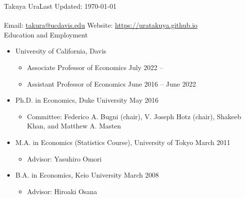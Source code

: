 \documentclass{article}
\begin{document}
{\large\noindent Takuya Ura}\hfill  Last Updated: \today \\
\\
Email: \href{mailto:takura@ucdavis.edu}{takura@ucdavis.edu} \hfill Website: \href{https://uratakuya.github.io}{https://uratakuya.github.io}\\

\bigskip\noindent Education and Employment 
\begin{itemize}
\item[] University of California, Davis
\begin{itemize}
\item[] Associate Professor of Economics \hfill July 2022 -- %
\item[] Assistant Professor of Economics \hfill June 2016 -- June 2022 %
\end{itemize}
\item[] Ph.D. in Economics, Duke University \hfill May 2016%
\begin{itemize}
\item[] Committee: Federico A. Bugni (chair), V. Joseph Hotz (chair), Shakeeb Khan, and Matthew A. Masten
\end{itemize}
\item[] M.A. in Economics (Statistics Course), University of Tokyo \hfill March 2011
\begin{itemize}
\item[] Advisor: Yasuhiro Omori
\end{itemize}
\item[] B.A. in Economics, Keio University   \hfill March 2008
\begin{itemize}
\item[] Advisor: Hiroaki Osana
\end{itemize}
\end{itemize}
\end{document}
